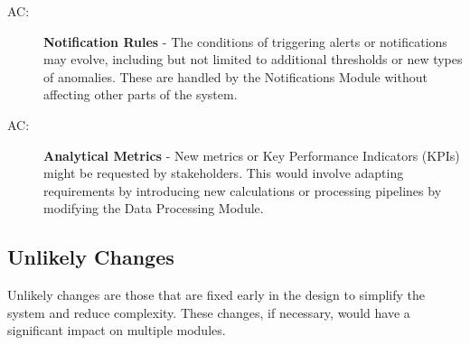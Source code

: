 \documentclass[12pt, titlepage]{article}
\newcounter{acnum}
\newcommand{\actheacnum}{AC\theacnum}
\begin{document}
\begin{description}
  \item[ \actheacnum \label{acNotifs}:] \textbf{Notification Rules} - 
  The conditions of triggering alerts or notifications may evolve, including but not limited to
  additional thresholds or new types of anomalies. These are handled by the Notifications Module
  without affecting other parts of the system.
  
  \item[ \actheacnum \label{acMetrics}:] \textbf{Analytical Metrics} - 
  New metrics or Key Performance Indicators (KPIs) might be requested by stakeholders. This would
  involve adapting requirements by introducing new calculations or processing pipelines by modifying
  the Data Processing Module.
  
\end{description}

\subsection{Unlikely Changes} \label{SecUchange}

Unlikely changes are those that are fixed early in the design to simplify the system
and reduce complexity. These changes, if necessary, would have a significant impact on
multiple modules.
\end{document}
